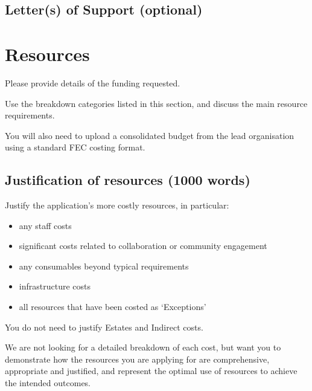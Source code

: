 \documentclass[12pt]{article}
\newenvironment{instruction}{%
    \begin{tcolorbox}[colback=red!5,colframe=red,title=Instruction]%
}{%
    \end{tcolorbox}%
}
\begin{document}
\subsection{Letter(s) of Support (optional)}

\pagebreak

\section{Resources}

\begin{instruction}

Please provide details of the funding requested.

Use the breakdown categories listed in this section, and discuss the main resource requirements.

You will also need to upload a consolidated budget from the lead organisation using a standard FEC costing format.

\end{instruction}

\subsection{Justification of resources (1000 words)}

\begin{instruction}

Justify the application’s more costly resources, in particular:

\begin{itemize}
    \item any staff costs
    \item significant costs related to collaboration or community engagement
    \item any consumables beyond typical requirements
    \item infrastructure costs
    \item all resources that have been costed as ‘Exceptions’
\end{itemize}

You do not need to justify Estates and Indirect costs.

We are not looking for a detailed breakdown of each cost, but want you to demonstrate how the resources you are applying for are comprehensive, appropriate and justified, and represent the optimal use of resources to achieve the intended outcomes.

\end{instruction}
\end{document}
